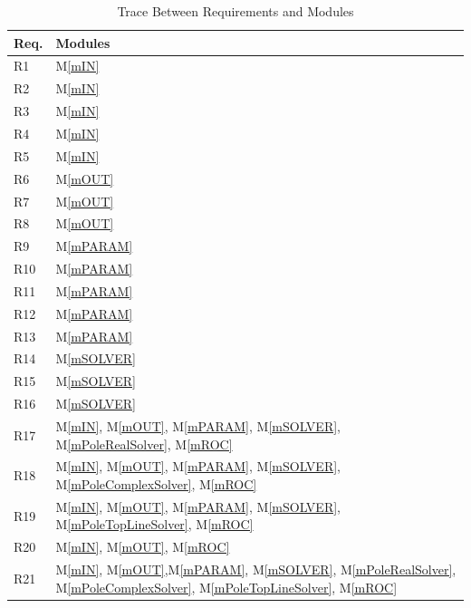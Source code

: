 \documentclass[12pt, titlepage]{article}
\newcommand{\mref}[1]{M\ref{#1}}
\begin{document}
\begin{table}[H]
\centering
\begin{tabular}{p{} p{}}
\toprule
\textbf{Req.} & \textbf{Modules}\\
\midrule
  R1  & \mref{mIN}\\
  R2  & \mref{mIN}\\
  R3  & \mref{mIN}\\
  R4  & \mref{mIN}\\
  R5  & \mref{mIN}\\
  R6  & \mref{mOUT}\\
  R7  & \mref{mOUT}\\
  R8  & \mref{mOUT}\\
  R9  & \mref{mPARAM}\\
  R10 & \mref{mPARAM}\\
  R11 & \mref{mPARAM}\\
  R12 & \mref{mPARAM}\\
  R13 & \mref{mPARAM}\\
  R14 & \mref{mSOLVER}\\
  R15 & \mref{mSOLVER}\\
  R16 & \mref{mSOLVER}\\
  R17 & \mref{mIN}, \mref{mOUT}, \mref{mPARAM}, \mref{mSOLVER}, \mref{mPoleRealSolver}, \mref{mROC}\\
  R18 & \mref{mIN}, \mref{mOUT}, \mref{mPARAM}, \mref{mSOLVER}, \mref{mPoleComplexSolver}, \mref{mROC}\\
  R19 & \mref{mIN}, \mref{mOUT}, \mref{mPARAM}, \mref{mSOLVER}, \mref{mPoleTopLineSolver}, \mref{mROC}\\
  R20 & \mref{mIN}, \mref{mOUT}, \mref{mROC}\\
  R21 & \mref{mIN}, \mref{mOUT},\mref{mPARAM}, \mref{mSOLVER}, \mref{mPoleRealSolver}, \mref{mPoleComplexSolver}, \mref{mPoleTopLineSolver}, \mref{mROC}\\
\bottomrule
\end{tabular}
\caption{Trace Between Requirements and Modules}
\label{tb:TblRT}
\end{table}
\end{document}
